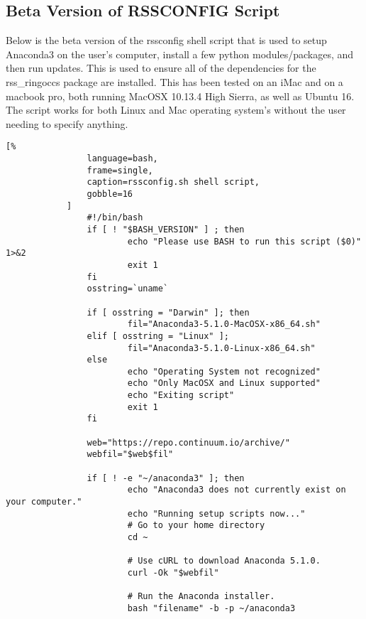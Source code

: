 \documentclass[crop=false,class=book,oneside]{standalone}
\begin{document}
        \subsection{Beta Version of RSSCONFIG Script}
            Below is the beta version of the rssconfig shell script
            that is used to setup Anaconda3 on the user's computer,
            install a few python modules/packages, and then run updates.
            This is used to ensure all of the dependencies for the
            rss\_ringoccs package are installed. This has been tested on
            an iMac and on a macbook pro, both running MacOSX 10.13.4
            High Sierra, as well as Ubuntu 16. The script works for both
            Linux and Mac operating system's without the user needing
            to specify anything.
            \begin{lstlisting}[%
                language=bash,
                frame=single,
                caption=rssconfig.sh shell script,
                gobble=16
            ]
                #!/bin/bash
                if [ ! "$BASH_VERSION" ] ; then
                        echo "Please use BASH to run this script ($0)" 1>&2
                        exit 1
                fi
                osstring=`uname`
                
                if [ osstring = "Darwin" ]; then
                        fil="Anaconda3-5.1.0-MacOSX-x86_64.sh"
                elif [ osstring = "Linux" ];
                        fil="Anaconda3-5.1.0-Linux-x86_64.sh"
                else
                        echo "Operating System not recognized"
                        echo "Only MacOSX and Linux supported"
                        echo "Exiting script"
                        exit 1
                fi
                
                web="https://repo.continuum.io/archive/"
                webfil="$web$fil"
                
                if [ ! -e "~/anaconda3" ]; then
                        echo "Anaconda3 does not currently exist on your computer."
                        echo "Running setup scripts now..."
                        # Go to your home directory
                        cd ~
                
                        # Use cURL to download Anaconda 5.1.0.
                        curl -Ok "$webfil"
                
                        # Run the Anaconda installer.
                        bash "filename" -b -p ~/anaconda3
                

\end{lstlisting}
\end{document}
